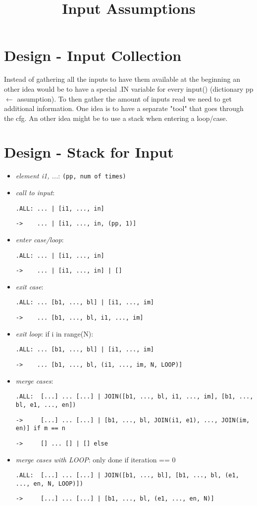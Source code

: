 \documentclass[11pt]{article}
\begin{document}
\title{Input Assumptions}

\maketitle


\section{Design - Input Collection}

Instead of gathering all the inputs to have them available at the beginning an other idea would be to have a special .IN variable for every input() (dictionary pp $\leftarrow$ assumption). To then gather the amount of inputs read we need to get additional information. One idea is to have a separate "tool" that goes through the cfg. An other idea might be to use a stack when entering a loop/case.

\section{Design - Stack for Input}

\begin{itemize}
\item \textit{element i1, ...}: \verb/(pp, num of times)/

\item \textit{call to input}: 

\verb/.ALL: ... | [i1, ..., in]/

\verb/->    ... | [i1, ..., in, (pp, 1)]/
\item \textit{enter case/loop}: 

\verb/.ALL: ... | [i1, ..., in]/

\verb/->    ... | [i1, ..., in] | []/
\item \textit{exit case}: 

\verb/.ALL: ... [b1, ..., bl] | [i1, ..., im]/

\verb/->    ... [b1, ..., bl, i1, ..., im]/

\item \textit{exit loop}: if i in range(N):

\verb/.ALL: ... [b1, ..., bl] | [i1, ..., im]/

\verb/->    ... [b1, ..., bl, (i1, ..., im, N, LOOP)]/
\item \textit{merge cases}: 

\verb/.ALL:  [...] ... [...] | JOIN([b1, ..., bl, i1, ..., im], [b1, ..., bl, e1, ..., en])/

\verb/->     [...] ... [...] | [b1, ..., bl, JOIN(i1, e1), ..., JOIN(im, en)] if m == n/

\verb/->     [] ... [] | [] else/
\item \textit{merge cases with LOOP}: only done if iteration == 0

\verb/.ALL:  [...] ... [...] | JOIN([b1, ..., bl], [b1, ..., bl, (e1, ..., en, N, LOOP)])/

\verb/->     [...] ... [...] | [b1, ..., bl, (e1, ..., en, N)]/


\end{itemize}
\end{document}
